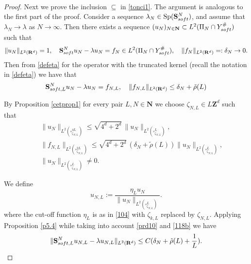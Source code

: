 \documentclass[10pt,a4paper]{amsart}
\DeclareMathOperator{\Sp}{Sp}
\def\RR{\R}
\newcommand\soft{{\rm soft}}
\newcommand{\R}{\mathbf{R}}
\renewcommand\AA{{\mathbf S}}
\begin{document}
\begin{proof}
	
	Next  we prove the inclusion $\subseteq$ in \eqref{tonci1}. The argument is analogous to the first part of the proof.
	Consider a sequence $\lambda_N \in \Sp (\AA_\soft^N)$, and assume that $\lambda_N \to \lambda$ as $N \to \infty$. Then there exists a  sequence
	$(u_N)_{N \in \mathbf{N}} \subset L^2(\Pi_N \cap Y_\soft^{\#})$ such that
	\begin{equation*}%
		\|u_N\|_{L^2(\RR^d)}=1, \quad \AA_\soft^{N} u_N-\lambda u_N=f_N \in L^2(\Pi_N \cap Y_\soft^{\#}),\quad  \|f_N\|_{L^2(\RR^d)}=:\delta_N \to 0. 	
	\end{equation*}
Then from \eqref{defeta} for the operator with the truncated kernel (recall the notation in \eqref{defeta}) we have that
		\begin{equation*}
		\AA_{\rm soft,L}^{N} u_N-\lambda u_N=f_{N,L}, \quad \|f_{N,L}\|_{L^2(\RR^d)} \leq \delta_N +\tilde{\rho}(L)
	\end{equation*}

	By Proposition \ref{cetprop1} for every pair $L,N \in \mathbf{N}$    we choose $\zeta_{N,L} \in L\mathbf{Z}^d$ such that
	\begin{eqnarray}\label{prd10}
		& &\|  u_N\|_{L^2(\square^{4L}_{\zeta_{N,L}})} \leq \sqrt{4^d+  2^d}\, \|  u_N\|_{L^2(\square^{ L}_{\zeta_{N,L}})},
		 \\
		 & &   \| f_{N,L}\|_{L^2(\square^{2L}_{\zeta_{N,L}})} \leq \sqrt{4^d+  2^d}\, (\delta_N +\tilde{\rho}(L))\| u_N\|_{L^2(\square^{L}_{\zeta_{N,L}})}, \label{118b}
		 \\ & &
           \|  u_N\|_{L^2(\square^{L}_{\zeta_{N,L}})} \neq 0.\nonumber
	\end{eqnarray}
	
	We define
	\begin{equation*} %
		u_{N,L} := \frac{\eta_L u_N}{\|u_N\|_{L^2(\square^L_{\zeta_{N,L} })}}.
	\end{equation*}	
	 where the cut-off function  $\eta_L $ is as in \eqref{104} with $\zeta_{k,L}$ replaced by $\zeta_{N,L}$. Applying Proposition \ref{p5.4} while taking into account \eqref{prd10} and \eqref{118b} we have
		\begin{equation} \label{utoest53}
		\| \AA_{\soft,L}^{N} u_{N,L}-\lambda u_{N,L}\|_{L^2(\RR^d)} \leq C (\delta_N +\tilde{\rho}(L) + \frac{1}{L}).
	\end{equation} 	
	

\end{proof}
\end{document}
